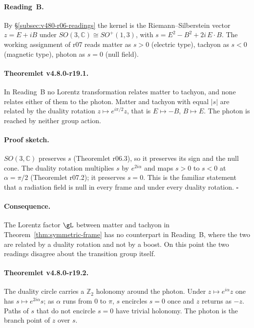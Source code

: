 \paragraph{Reading~B.}
By \S\ref{subsec:v480-r06-readings} the kernel is the Riemann--Silberstein vector \(z=E+iB\) under
\(SO(3,\mathbb C)\cong SO^+(1,3)\), with \(s=E^2-B^2+2i\,E\cdot B\).  The working assignment of r07 reads matter as
\(s>0\) (electric type), tachyon as \(s<0\) (magnetic type), photon as \(s=0\) (null field).

\paragraph{Theoremlet v4.8.0-r19.1.}
In Reading~B no Lorentz transformation relates matter to tachyon, and none relates either of them to the photon.
Matter and tachyon with equal \(|s|\) are related by the duality rotation \(z\mapsto e^{i\pi/2}z\), that is
\(E\mapsto-B\), \(B\mapsto E\).  The photon is reached by neither group action.

\paragraph{Proof sketch.}
\(SO(3,\mathbb C)\) preserves \(s\) (Theoremlet r06.3), so it preserves its sign and the null cone.  The duality
rotation multiplies \(s\) by \(e^{2i\alpha}\) and maps \(s>0\) to \(s<0\) at \(\alpha=\pi/2\)
(Theoremlet r07.2); it preserves \(s=0\).  This is the familiar statement that a radiation field is null in every
frame and under every duality rotation.  \(\square\)

\paragraph{Consequence.}
The Lorentz factor \(\gL\) between matter and tachyon in Theorem~\ref{thm:symmetric-frame} has no counterpart in
Reading~B, where the two are related by a duality rotation and not by a boost.  On this point the two readings
disagree about the transition group itself.

\paragraph{Theoremlet v4.8.0-r19.2.}
The duality circle carries a \(\mathbb Z_2\) holonomy around the photon.  Under \(z\mapsto e^{i\alpha}z\) one has
\(s\mapsto e^{2i\alpha}s\); as \(\alpha\) runs from \(0\) to \(\pi\), \(s\) encircles \(s=0\) once and \(z\) returns as
\(-z\).  Paths of \(s\) that do not encircle \(s=0\) have trivial holonomy.  The photon is the branch point of
\(z\) over \(s\).

